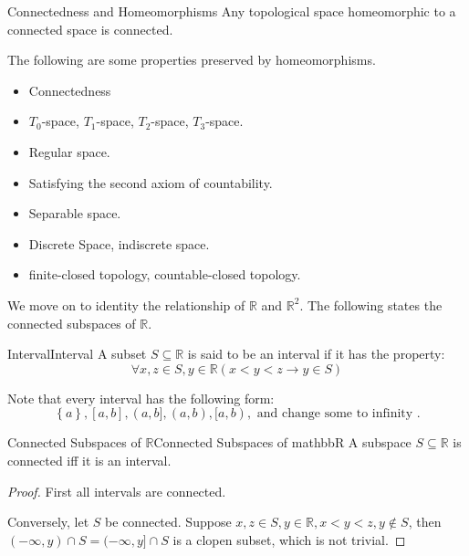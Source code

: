 \documentclass[../main.tex]{subfiles}
\begin{document}
\begin{proposition}{}{Connectedness and Homeomorphisms}
Any topological space homeomorphic to a connected space is connected.
\end{proposition}
 The following are some properties preserved by homeomorphisms.
 \begin{itemize}
 \item Connectedness
 \item $T_0$-space, $T_1$-space, $T_2$-space, $T_3$-space.
 \item Regular space.
 \item Satisfying the second axiom of countability.
 \item Separable space.
 \item Discrete Space, indiscrete space.
 \item finite-closed topology, countable-closed topology.
 \end{itemize}

 We move on to identity the relationship of $\mathbb{R}$ and $\mathbb{R}^2$. The following states the connected subspaces of $\mathbb{R}$.
 \begin{definition}{Interval}{Interval}
 A subset $S \subseteq \mathbb{R}$ is said to be an interval if it has the property: 
 \begin{equation*}
 \forall x,z\in S, y\in \mathbb{R} (x<y<z \rightarrow y\in S)
 \end{equation*}
 \end{definition}

 \begin{remark}
 Note that every interval has the following form:
 \begin{equation*}
	 \left\{ a \right\}, [a,b],(a,b],(a,b),[a,b), \text{ and change some to infinity }.
 \end{equation*}
 \end{remark}

 \begin{proposition}{Connected Subspaces of $\mathbb{R}$}{Connected Subspaces of mathbbR}
 A subspace $S \subseteq \mathbb{R}$ is connected iff it is an interval.
 \end{proposition}
 \begin{proof}
 First all intervals are connected.

 Conversely, let $S$ be connected. Suppose $x,z\in S, y\in \mathbb{R},x<y<z, y\notin S$, then $(-\infty ,y)\cap S = (-\infty ,y]\cap S$ is a clopen subset, which is not trivial.
\end{proof}
\end{document}
